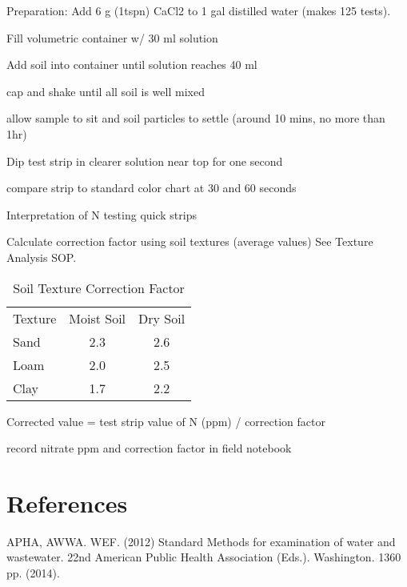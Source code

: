 \documentclass[12pt]{../SOP2}
\begin{document}
\NP Preparation: Add 6 g (1tspn) CaCl2 to 1 gal distilled water (makes 125 tests).

\NP Fill volumetric container w/ 30 ml solution

\NP Add soil into container until solution reaches 40 ml

\NP cap and shake until all soil is well mixed

\NP allow sample to sit and soil particles to settle (around 10 mins, no more than 1hr)

\NP Dip test strip in clearer solution near top for one second

\NP compare strip to standard color chart at 30 and 60 seconds

\NP Interpretation of N testing quick strips

\NP Calculate correction factor using soil textures  (average values) See Texture Analysis SOP.

\begin{table}
\caption{Soil Texture Correction Factor}
\centering
\begin{tabular}{lcc}
Texture     & Moist Soil  & Dry Soil  \\
Sand        &   2.3         &  2.6      \\
Loam        &   2.0       &  2.5      \\
Clay        &   1.7       & 2.2 \\
\end{tabular}
\end{table}

\NP Corrected value = test strip value of N (ppm) / correction factor

\NP record nitrate ppm and correction factor in field notebook


\section{References}

\NP APHA, AWWA. WEF. (2012) Standard Methods for examination of water and wastewater. 22nd American Public Health Association (Eds.). Washington. 1360 pp. (2014).
\end{document}
